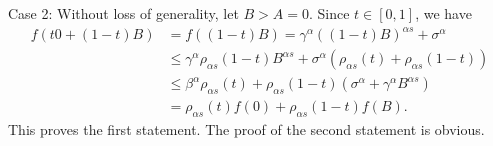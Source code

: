 \documentclass[10pt]{article}
\begin{document}
Case 2: Without loss of generality, let $B>A=0$. Since $t\in[0,1]$, we have
\begin{align} 
f(t0 +(1-t) B)&= f((1-t)B) = \gamma^\alpha ((1-t)B)^{\alpha s} +\sigma^\alpha   \nonumber
\\&\leq \gamma^\alpha \rho_{\alpha s}(1-t)B^{\alpha s} +\sigma^\alpha (\rho_{\alpha s}(t)+\rho_{\alpha s}(1-t))  \nonumber
 \nonumber
\\&\leq \beta^\alpha \rho_{\alpha s}(t) + \rho_{\alpha s}(1-t)(\sigma^\alpha +\gamma^\alpha B^{\alpha s} )
 \nonumber
\\& = \rho_{\alpha s}(t)  f(0) + \rho_{\alpha s}(1-t) f(B). \nonumber 
\end{align}
This proves the first statement. The proof of the second statement is obvious.
\end{document}
